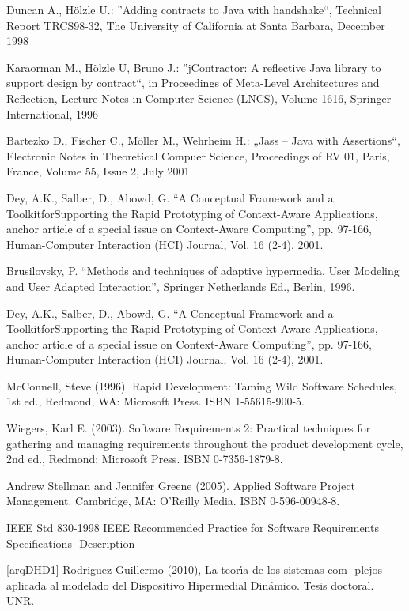 \begin{thebibliography}{1}
{
Duncan A., Hölzle U.: ''Adding contracts to Java with handshake``,
Technical Report TRCS98-32, The University of California at Santa
Barbara, December 1998

Karaorman M., Hölzle U, Bruno J.: ''jContractor: A
reflective Java
library to support design by contract``, in Proceedings of Meta-Level
Architectures and Reflection, Lecture Notes in Computer Science
(LNCS), Volume 1616, Springer International, 1996

Bartezko D., Fischer C., Möller M., Wehrheim H.: „Jass – Java with
Assertions“, Electronic Notes in Theoretical Compuer Science,
Proceedings of RV 01, Paris, France, Volume 55, Issue 2, July 2001

Dey, A.K., Salber, D., Abowd, G. “A Conceptual Framework and a
ToolkitforSupporting the Rapid Prototyping of Context-Aware Applications, anchor
article of a special issue on Context-Aware Computing”, pp.
97-166, Human-Computer  Interaction (HCI) Journal, Vol. 16 (2-4), 2001.

Brusilovsky, P. “Methods and techniques of adaptive hypermedia. User Modeling
and User Adapted Interaction”, Springer Netherlands Ed., Berlín, 1996. 

Dey, A.K., Salber, D., Abowd, G. “A Conceptual Framework and a
ToolkitforSupporting the Rapid Prototyping of Context-Aware Applications, anchor
article of a special issue on Context-Aware Computing”, pp.
97-166, Human-Computer  Interaction (HCI) Journal, Vol. 16 (2-4), 2001.



 McConnell, Steve (1996). Rapid Development: Taming
Wild Software Schedules, 1st ed., Redmond, WA: Microsoft Press. ISBN
1-55615-900-5.


 Wiegers, Karl E. (2003). Software Requirements 2:
Practical techniques for gathering and managing requirements throughout the
product development cycle, 2nd ed., Redmond: Microsoft Press. ISBN
0-7356-1879-8.


 Andrew Stellman and Jennifer Greene (2005). Applied
Software Project Management. Cambridge, MA: O'Reilly Media. ISBN 0-596-00948-8.


IEEE Std 830-1998 IEEE Recommended Practice for Software
Requirements Specifications -Description


[arqDHD1] Rodriguez Guillermo (2010), La teorı́a de los sistemas com-
plejos aplicada al modelado del Dispositivo Hipermedial
Dinámico. Tesis doctoral. UNR.

}
\end{thebibliography}
